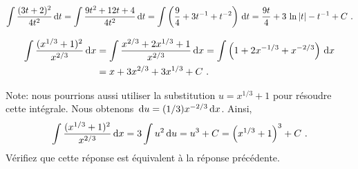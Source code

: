 {
\[
\int \frac{(3t+2)^2}{4t^2}\,\mathrm{d}t = \int \frac{9t^2+12t+4}{4t^2}\,\mathrm{d}t =
\int \left( \frac{9}{4} + 3 t^{-1} + t^{-2} \right) \,\mathrm{d}t =
\frac{9t}{4} + 3\,\ln|t| - t^{-1} + C \ .
\]

\begin{align*}
\int \frac{(x^{1/3} + 1)^2}{x^{2/3}} \,\mathrm{d}x
&= \int \frac{x^{2/3} + 2 x^{1/3} + 1}{x^{2/3}} \,\mathrm{d}x
= \int \left( 1 + 2 x^{-1/3} + x^{-2/3}\right) \,\mathrm{d}x \\
&= x + 3 x^{2/3} + 3 x^{1/3} + C \ .
\end{align*}

\noindent Note: nous pourrions aussi utiliser la substitution $u = x^{1/3} + 1$
pour résoudre cette intégrale.  Nous obtenons
$\,\mathrm{d}u = (1/3) x^{-2/3} \,\mathrm{d}x$.  Ainsi,
\[
\int \frac{(x^{1/3} + 1)^2}{x^{2/3}} \,\mathrm{d}x
= 3 \int u^2 \,\mathrm{d}u
= u^3 + C
= \left(x^{1/3} + 1\right)^3 + C \ .
\]
Vérifiez que cette réponse est équivalent à la réponse précédente.
}

